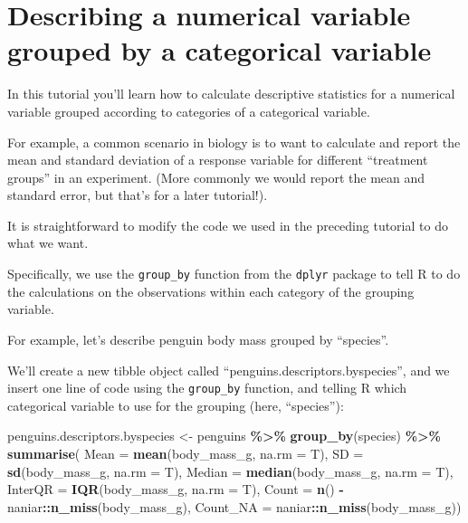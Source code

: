 \documentclass[
]{book}
\newenvironment{Shaded}{\begin{snugshade}}{\end{snugshade}}
\newcommand{\AttributeTok}[1]{\textcolor[rgb]{0.13,0.29,0.53}{#1}}
\newcommand{\FunctionTok}[1]{\textcolor[rgb]{0.13,0.29,0.53}{\textbf{#1}}}
\newcommand{\NormalTok}[1]{#1}
\newcommand{\OtherTok}[1]{\textcolor[rgb]{0.56,0.35,0.01}{#1}}
\newcommand{\SpecialCharTok}[1]{\textcolor[rgb]{0.81,0.36,0.00}{\textbf{#1}}}
\begin{document}
\section{Describing a numerical variable grouped by a categorical variable}\label{desc_numeric_var_cat}

In this tutorial you'll learn how to calculate descriptive statistics for a numerical variable grouped according to categories of a categorical variable.

For example, a common scenario in biology is to want to calculate and report the mean and standard deviation of a response variable for different ``treatment groups'' in an experiment. (More commonly we would report the mean and standard error, but that's for a later tutorial!).

It is straightforward to modify the code we used in the preceding tutorial to do what we want.

Specifically, we use the \texttt{group\_by} function from the \texttt{dplyr} package to tell R to do the calculations on the observations within each category of the grouping variable.

For example, let's describe penguin body mass grouped by ``species''.

We'll create a new tibble object called ``penguins.descriptors.byspecies'', and we insert one line of code using the \texttt{group\_by} function, and telling R which categorical variable to use for the grouping (here, ``species''):

\begin{Shaded}
\begin{Highlighting}[]
\NormalTok{penguins.descriptors.byspecies }\OtherTok{\textless{}{-}}\NormalTok{ penguins }\SpecialCharTok{\%\textgreater{}\%}
  \FunctionTok{group\_by}\NormalTok{(species) }\SpecialCharTok{\%\textgreater{}\%}
\FunctionTok{summarise}\NormalTok{(}
  \AttributeTok{Mean =} \FunctionTok{mean}\NormalTok{(body\_mass\_g, }\AttributeTok{na.rm =}\NormalTok{ T),}
  \AttributeTok{SD =} \FunctionTok{sd}\NormalTok{(body\_mass\_g, }\AttributeTok{na.rm =}\NormalTok{ T),}
  \AttributeTok{Median =} \FunctionTok{median}\NormalTok{(body\_mass\_g, }\AttributeTok{na.rm =}\NormalTok{ T),}
  \AttributeTok{InterQR =} \FunctionTok{IQR}\NormalTok{(body\_mass\_g, }\AttributeTok{na.rm =}\NormalTok{ T),}
  \AttributeTok{Count =} \FunctionTok{n}\NormalTok{() }\SpecialCharTok{{-}}\NormalTok{ naniar}\SpecialCharTok{::}\FunctionTok{n\_miss}\NormalTok{(body\_mass\_g),}
  \AttributeTok{Count\_NA =}\NormalTok{ naniar}\SpecialCharTok{::}\FunctionTok{n\_miss}\NormalTok{(body\_mass\_g))}
\end{Highlighting}
\end{Shaded}
\end{document}
